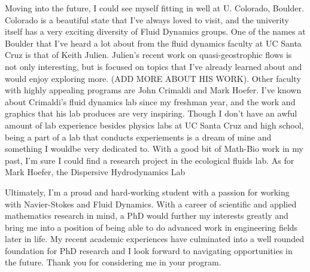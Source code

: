 \documentclass{article}
\begin{document}
Moving into the future, I could see myself fitting in well at U. Colorado, Boulder. Colorado is a beautiful state that I've always loved to visit, and the univerity itself has a very exciting diversity of Fluid Dynamics groups. One of the names at Boulder that I've heard a lot about from the fluid dynamics faculty at UC Santa Cruz is that of Keith Julien. Julien's recent work on quasi-geostrophic flows is not only interesting, but is focused on topics that I've already learned about and would enjoy exploring more. (ADD MORE ABOUT HIS WORK). Other faculty with highly appealing programs are John Crimaldi and Mark Hoefer. I've known about Crimaldi's fluid dynamics lab since my freshman year, and the work and graphics that his lab produces are very inspiring. Though I don't have an awful amount of lab experience besides physics labs at UC Santa Cruz and high school, being a part of a lab that conducts experiements is a dream of mine and something I wouldbe very dedicated to. With a good bit of Math-Bio work in my past, I'm sure I could find a research project in the ecological fluids lab. As for Mark Hoefer, the Dispersive Hydrodynamics Lab 

Ultimately, I'm a proud and hard-working student with a passion for working with Navier-Stokes and Fluid Dynamics. With a career of scientific and applied mathematics research in mind, a PhD would further my interests greatly and bring me into a position of being able to do advanced work in engineering fields later in life. My recent academic experiences have culminated into a well rounded foundation for PhD research and I look forward to navigating opportunities in the future. Thank you for considering me in your program. 

\end{document}
